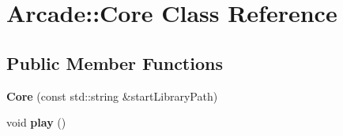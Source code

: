 \hypertarget{classArcade_1_1Core}{}\section{Arcade\+::Core Class Reference}
\label{classArcade_1_1Core}
\subsection*{Public Member Functions}
\begin{DoxyCompactItemize}
\item 
\mbox{\label{classArcade_1_1Core_a90e4ca21cf158c6052c5260dd1c2d3fe}} 
{\bfseries Core} (const std\+::string \&start\+Library\+Path)
\item 
\mbox{\label{classArcade_1_1Core_a1fa1bbdf2f04998f4c2a2d085821b9dd}} 
void {\bfseries play} ()
\end{DoxyCompactItemize}
